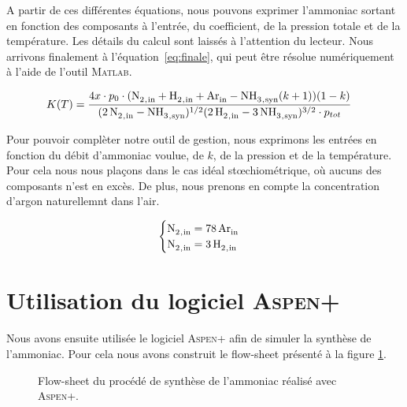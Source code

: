 A partir de ces différentes équations, nous pouvons exprimer l'ammoniac
sortant en fonction des composants à l'entrée, du coefficient, de la pression
totale et de la température. Les détails du calcul sont laissés à l'attention 
du lecteur. Nous arrivons finalement à l'équation~\eqref{eq:finale}, qui peut
être résolue numériquement à l'aide de l'outil \textsc{Matlab}.  

\begin{align}
	K(T) & = \frac{4x\cdot p_0\cdot (\ce{N2_{,in} + H2_{,in} + Ar_{in}} - 
	\ce{NH3_{,syn}}(k + 1)) (1 - k)}{(\ce{2N2_{,in} - NH3_{,syn}})^{1/2} (\ce{2H2_{,in} - 3NH3_{,syn}})^{3/2} \cdot p_{tot}}
	\label{eq:finale}
\end{align}

Pour pouvoir complèter notre outil de gestion, nous exprimons les entrées 
en fonction du débit d'ammoniac voulue, de $k$, de la pression et de la
température. Pour cela nous nous plaçons dans le cas idéal stœchiométrique,
où aucuns des composants n'est en excès. De plus, nous prenons en compte la 
concentration d'argon naturellemnt dans l'air. 
 
$$
\begin{cases}
 \ce{N2_{,in}} = \ce{78Ar_{in}}\\ 
 \ce{N2_{,in}} = \ce{3H2_{,in}} \\
\end{cases}
$$

\section{Utilisation du logiciel \textsc{Aspen+}}
Nous avons ensuite utilisée le logiciel \textsc{Aspen+}
afin de simuler la synthèse de l'ammoniac. Pour cela
nous avons construit le flow-sheet présenté à la figure
\ref{fig:flow-sheet-aspen}. 

\begin{figure}
	\centering
	\caption{Flow-sheet du procédé de synthèse de l'ammoniac
	réalisé avec \textsc{Aspen+}.}
	\label{fig:flow-sheet-aspen}
\end{figure}

